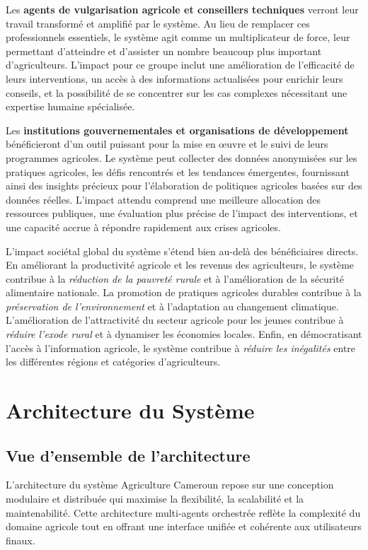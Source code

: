 Les \textbf{agents de vulgarisation agricole et conseillers techniques} verront leur travail transformé et amplifié par le système. Au lieu de remplacer ces professionnels essentiels, le système agit comme un multiplicateur de force, leur permettant d'atteindre et d'assister un nombre beaucoup plus important d'agriculteurs. L'impact pour ce groupe inclut une amélioration de l'efficacité de leurs interventions, un accès à des informations actualisées pour enrichir leurs conseils, et la possibilité de se concentrer sur les cas complexes nécessitant une expertise humaine spécialisée.

Les \textbf{institutions gouvernementales et organisations de développement} bénéficieront d'un outil puissant pour la mise en œuvre et le suivi de leurs programmes agricoles. Le système peut collecter des données anonymisées sur les pratiques agricoles, les défis rencontrés et les tendances émergentes, fournissant ainsi des insights précieux pour l'élaboration de politiques agricoles basées sur des données réelles. L'impact attendu comprend une meilleure allocation des ressources publiques, une évaluation plus précise de l'impact des interventions, et une capacité accrue à répondre rapidement aux crises agricoles.

L'impact sociétal global du système s'étend bien au-delà des bénéficiaires directs. En améliorant la productivité agricole et les revenus des agriculteurs, le système contribue à la \emph{réduction de la pauvreté rurale} et à l'amélioration de la sécurité alimentaire nationale. La promotion de pratiques agricoles durables contribue à la \emph{préservation de l'environnement} et à l'adaptation au changement climatique. L'amélioration de l'attractivité du secteur agricole pour les jeunes contribue à \emph{réduire l'exode rural} et à dynamiser les économies locales. Enfin, en démocratisant l'accès à l'information agricole, le système contribue à \emph{réduire les inégalités} entre les différentes régions et catégories d'agriculteurs.

\section{Architecture du Système}

\subsection{Vue d'ensemble de l'architecture}

L'architecture du système Agriculture Cameroun repose sur une conception modulaire et distribuée qui maximise la flexibilité, la scalabilité et la maintenabilité. Cette architecture multi-agents orchestrée reflète la complexité du domaine agricole tout en offrant une interface unifiée et cohérente aux utilisateurs finaux.


